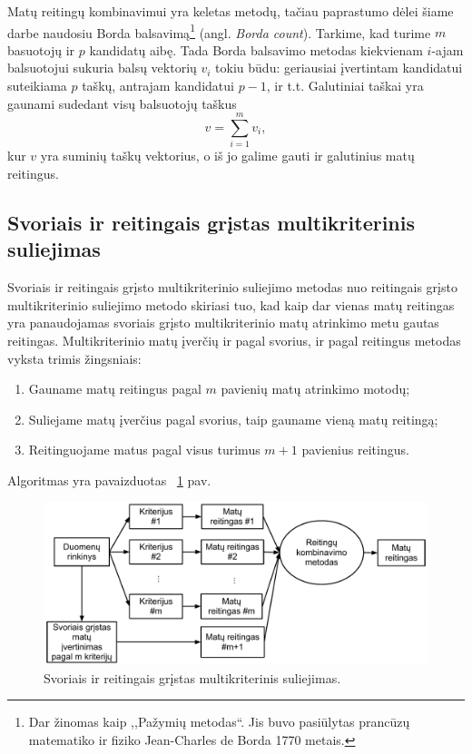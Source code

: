 Matų reitingų kombinavimui yra keletas metodų\cite{dwork2001rank}, tačiau paprastumo dėlei šiame darbe naudosiu Borda balsavimą\footnote{Dar žinomas kaip ,,Pažymių metodas``. Jis buvo pasiūlytas prancūzų matematiko ir fiziko Jean-Charles de Borda 1770 metais.} (angl.\textit{ Borda count}). Tarkime, kad turime $m$ basuotojų ir $p$ kandidatų aibę. Tada Borda balsavimo metodas kiekvienam $i$-ajam balsuotojui sukuria balsų vektorių $v_i$ tokiu būdu: geriausiai įvertintam kandidatui suteikiama $p$ taškų, antrajam kandidatui $p-1$, ir t.t. Galutiniai taškai yra gaunami sudedant visų balsuotojų taškus
\begin{equation}
 v = \sum_{i=1}^m v_i,
\end{equation}
kur $v$ yra suminių taškų vektorius, o iš jo galime gauti ir galutinius matų reitingus.

\subsection{Svoriais ir reitingais grįstas multikriterinis suliejimas}

Svoriais ir reitingais grįsto multikriterinio suliejimo metodas nuo reitingais grįsto multikriterinio suliejimo metodo skiriasi tuo, kad kaip dar vienas matų reitingas yra panaudojamas svoriais grįsto multikriterinio matų atrinkimo metu gautas reitingas. Multikriterinio matų įverčių ir pagal svorius, ir pagal reitingus metodas vyksta trimis žingsniais:
\begin{enumerate}
  \item Gauname matų reitingus pagal $m$ pavienių matų atrinkimo motodų;
  \item Suliejame matų įverčius pagal svorius, taip gauname vieną matų reitingą;
  \item Reitinguojame matus pagal visus turimus $m+1$ pavienius reitingus.
\end{enumerate} 
Algoritmas yra pavaizduotas ~\ref{fig:figure3} pav.
\begin{figure}
 \centering
 \includegraphics[width=1\textwidth]{images/score_and_ranking_based_fusion.pdf}
 \caption{Svoriais ir reitingais grįstas multikriterinis suliejimas.}
 \label{fig:figure3}
\end{figure}

